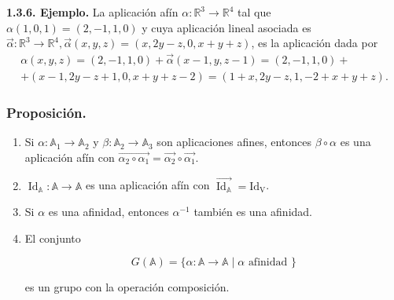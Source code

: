 \documentclass[12pt, a4paper, ones, notitlepage, openany,titlepage]{article}
\begin{document}
\textbf{1.3.6. Ejemplo.} La aplicación afín $\alpha: \mathbb{R}^{3} \rightarrow \mathbb{R}^{4}$ tal que $\alpha(1,0,1)=(2,-1,1,0)$ y cuya aplicación lineal asociada es $\vec{\alpha}: \mathbb{R}^{3} \rightarrow \mathbb{R}^{4}, \vec{\alpha}(x, y, z)=(x, 2 y-z, 0, x+y+z)$, es la aplicación dada por
\begin{gather*}
\alpha(x, y, z) =(2,-1,1,0)+\vec{\alpha}(x-1, y, z-1)=(2,-1,1,0)+\\+(x-1,2 y-z+1,0, x+y+z-2) =(1+x, 2 y-z, 1,-2+x+y+z).
\end{gather*}

\subsubsection{Proposición.}
\begin{enumerate}
\item Si $\alpha: \mathbb{A}_{1} \rightarrow \mathbb{A}_{2}$ y $\beta: \mathbb{A}_{2} \rightarrow \mathbb{A}_{3}$ son aplicaciones afines, entonces $\beta \circ \alpha$ es una aplicación afín con $\overrightarrow{\alpha_{2}\circ\alpha_{1}}=\overrightarrow{\alpha_{2}}\circ\overrightarrow{\alpha_{1}}$.

\item $\operatorname{Id}_{\mathbb{A}}: \mathbb{A} \rightarrow \mathbb{A}$ es una aplicación afín con $\overrightarrow{\operatorname{Id}_{\mathbb{A}}}=\operatorname{Id_{V}}$.

\item Si $\alpha$ es una afinidad, entonces $\alpha^{-1}$ también es una afinidad.

\item El conjunto

$$
G(\mathbb{A})=\{\alpha: \mathbb{A} \rightarrow \mathbb{A} \mid \alpha \text { afinidad }\}
$$

es un grupo con la operación composición.
\end{enumerate}
\end{document}
